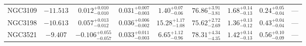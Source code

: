 \documentclass[twocolumn,tighten]{aastex63}
\begin{document}
\begin{table}
\begin{center}
\begin{tabular}{lcccccccc}
    NGC3109 & $ -11.513 $ & $ 0.012 _{ -0.010 } ^{ + 0.010 } $ & $ 0.031 _{ -0.003 } ^{ + 0.007 } $ & $ 1.40 _{ -0.06 } ^{ + 0.07 } $ & $ 76.86 _{ -3.81 } ^{ + 3.91 } $ & $ 1.68 _{ -0.13 } ^{ + 0.14 } $ & $ 0.24 _{ -0.04 } ^{ + 0.05 } $ & --- \\  
    NGC3198 & $ -10.613 $ & $ 0.057 _{ -0.012 } ^{ + 0.013 } $ & $ 0.036 _{ -0.002 } ^{ + 0.006 } $ & $ 15.28 _{ -1.08 } ^{ + 1.17 } $ & $ 75.62 _{ -2.69 } ^{ + 2.72 } $ & $ 1.36 _{ -0.12 } ^{ + 0.13 } $ & $ 0.43 _{ -0.04 } ^{ + 0.04 } $ & --- \\  
    NGC3521 & $ -9.407 $ & $ -0.106 _{ -0.057 } ^{ + 0.055 } $ & $ 0.033 _{ -0.003 } ^{ + 0.011 } $ & $ 6.65 _{ -0.96 } ^{ + 1.12 } $ & $ 78.31 _{ -4.35 } ^{ + 4.34 } $ & $ 1.42 _{ -0.13 } ^{ + 0.14 } $ & $ 0.56 _{ -0.09 } ^{ + 0.10 } $ & --- \\  
 \hline
\end{tabular}
\end{center}
\end{table}

\newpage
\end{document}
